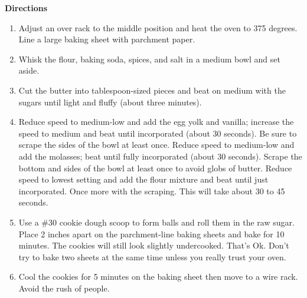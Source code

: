 \documentclass{article}
\begin{document}
\textbf{Directions}

\begin{enumerate}
      \item Adjust an over rack to the middle position and heat the oven to 375 degrees. Line a large baking sheet
            with parchment paper.
      \item Whisk the flour, baking soda, spices, and salt in a medium bowl and set aside.
      \item Cut the butter into tablespoon-sized pieces and beat on medium with the sugars until light and fluffy
            (about three minutes).
      \item Reduce speed to medium-low and add the egg yolk and vanilla; increase the speed to medium and beat
            until incorporated (about 30 seconds). Be sure to scrape the sides of the bowl at least once. Reduce
            speed to medium-low and add the molasses; beat until fully incorporated (about 30 seconds). Scrape the
            bottom and sides of the bowl at least once to avoid globs of butter. Reduce speed to lowest setting
            and add the flour mixture and beat until just incorporated. Once more with the scraping. This will
            take about 30 to 45 seconds.
      \item Use a \#30 cookie dough scoop to form balls and roll them in the raw sugar.
            Place 2 inches apart on the parchment-line baking sheets and bake for 10 minutes. The cookies will
            still look slightly undercooked. That's Ok. Don't try to bake two sheets at the same time unless
            you really trust your oven.
      \item Cool the cookies for 5 minutes on the baking sheet then move to a wire rack. Avoid the rush of people.
\end{enumerate}


\end{document}
